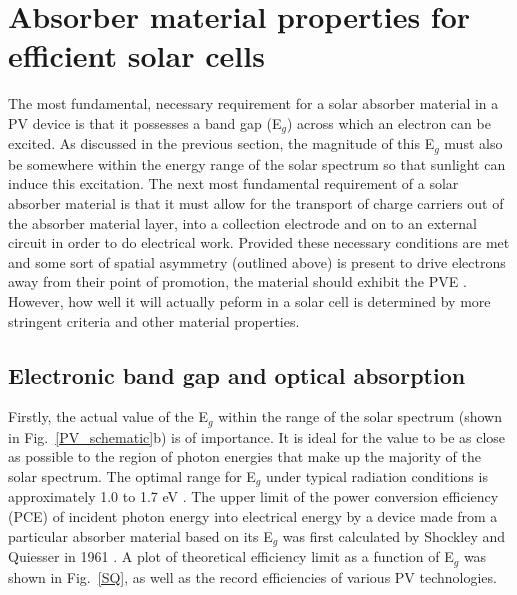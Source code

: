 \documentclass[11pt, twoside]{report}
\begin{document}
\section{Absorber material properties for efficient solar cells}\label{PV_properties}
The most fundamental, necessary requirement for a solar absorber material in a PV device is that it possesses a band gap (E$_g$) across which an electron can be excited. As discussed in the previous section, the magnitude of this E$_g$ must also be somewhere within the energy range of the solar spectrum so that sunlight can induce this excitation. The next most fundamental requirement of a solar absorber material is that it must allow for the transport of charge carriers out of the absorber material layer, into a collection electrode and on to an external circuit in order to do electrical work. Provided these necessary conditions are met and some sort of spatial asymmetry (outlined above) is present to drive electrons away from their point of promotion, the material should exhibit the PVE \cite{Nelson2}. However, how well it will actually peform in a solar cell is determined by more stringent criteria and other material properties. 

\subsection{Electronic band gap and optical absorption}

Firstly, the actual value of the E$_g$ within the range of the solar spectrum (shown in Fig.~\ref{PV_schematic}b) is of importance. It is ideal for the value to be as close as possible to the region of photon energies that make up the majority of the solar spectrum. The optimal range for E$_g$ under typical radiation conditions is approximately 1.0 to 1.7 eV \cite{PV_E_range}. The upper limit of the power conversion efficiency (PCE) of incident photon energy into electrical energy by a device made from a particular absorber material based on its E$_g$ was first calculated by Shockley and Quiesser in 1961 \cite{SQ_1961}. A plot of theoretical efficiency limit as a function of E$_g$ was shown in Fig.~\ref{SQ}, as well as the record efficiencies of various PV technologies.
\end{document}
